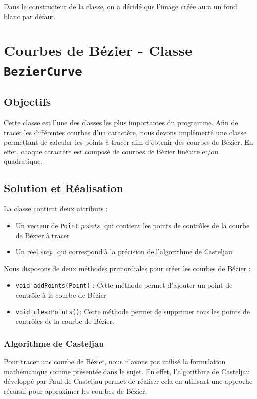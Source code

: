 \documentclass[a4paper, 12pt]{article}
\begin{document}
Dans le constructeur de la classe, on a décidé que l'image créée aura un fond blanc par défaut. 


\section{Courbes de Bézier - Classe \texttt{BezierCurve}}	
\subsection{Objectifs	}
Cette classe est l’une des classes les plus importantes du programme. Afin de tracer les différentes courbes d’un caractère, nous devons implémenté une classe permettant de calculer les points à tracer afin d'obtenir des courbes de Bézier. En effet, chaque caractère est composé de courbes de Bézier linéaire et/ou quadratique.

\subsection{Solution et Réalisation}
La classe contient deux attributs : 
\begin{itemize}
	\item Un vecteur de \texttt{Point} $points\_$ qui contient les points de contrôles de la courbe de Bézier à tracer
 	\item Un réel $step\_$ qui correspond à la précision de l'algorithme de Casteljau
\end{itemize}
\vspace*{0.5cm}
Nous disposons de deux méthodes primordiales pour créer les courbes de Bézier :
\begin{itemize}
\item \texttt{void addPoints(Point)} : Cette méthode permet d'ajouter un point de contrôle à la courbe de Bézier
\item \texttt{void clearPoints()}: Cette méthode permet de supprimer tous les points de contrôles de la courbe de Bézier.
\end{itemize}

\subsubsection{Algorithme de Casteljau}
Pour tracer une courbe de Bézier, nous n'avons pas utilisé la formulation mathématique comme présentée dans le sujet. En effet, l’algorithme de Casteljau développé par Paul de Casteljau permet de réaliser cela en utilisant une approche récursif pour approximer les courbes de Bézier.
\end{document}
